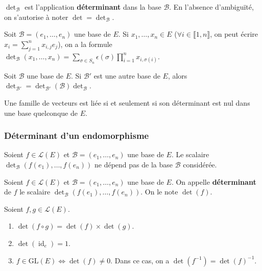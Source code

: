   \begin{definition}
    $\det_{\mathcal{B}}$ est l'application \textbf{déterminant} dans la base $\mathcal{B}$. En l'absence d'ambiguïté, on s'autorise à noter $\det = \det_{\mathcal{B}}$.
  \end{definition}

  \begin{proposition}
    Soit $\mathcal{B} = (e_1, \dots, e_n)$ une base de $E$. Si $x_1, \dots, x_n \in E$ ($\forall i \in \llbracket 1, n \rrbracket$, on peut écrire $x_i = \sum_{j=1}^n x_{i,j} e_j$), on a la formule $\det_{\mathcal{B}}(x_1, \dots, x_n) = \sum_{\sigma \in S_n} \epsilon(\sigma) \prod_{i=1}^n x_{i,\sigma(i)}$.
  \end{proposition}

  \begin{proposition}
    Soit $\mathcal{B}$ une base de $E$. Si $\mathcal{B}'$ est une autre base de $E$, alors $\det_{\mathcal{B}'} = \det_{\mathcal{B}'}(\mathcal{B}) \det_{\mathcal{B}}$.
  \end{proposition}

  \begin{theorem}
    Une famille de vecteurs est liée si et seulement si son déterminant est nul dans une base quelconque de $E$.
  \end{theorem}

  \subsubsection{Déterminant d'un endomorphisme}

  \begin{lemma}
    Soient $f \in \mathcal{L}(E)$ et $\mathcal{B} = (e_1, \dots, e_n)$ une base de $E$. Le scalaire $\det_{\mathcal{B}}(f(e_1), \dots, f(e_n))$ ne dépend pas de la base $\mathcal{B}$ considérée.
  \end{lemma}

  \begin{definition}
    Soient $f \in \mathcal{L}(E)$ et $\mathcal{B} = (e_1, \dots, e_n)$ une base de $E$. On appelle \textbf{déterminant} de $f$ le scalaire $\det_{\mathcal{B}}(f(e_1), \dots, f(e_n))$. On le note $\det(f)$.
  \end{definition}

  \begin{proposition}
    Soient $f, g \in \mathcal{L}(E)$.
    \begin{enumerate}[label={\bfseries(\roman*)}]
      \item $\det (f \circ g) = \det(f) \times \det(g)$.
      \item $\det (\operatorname{id}_e) = 1$.
      \item $f \in \mathrm{GL}(E) \iff \det(f) \neq 0$. Dans ce cas, on a $\det(f^{-1}) = \det(f)^{-1}$.
    \end{enumerate}
  \end{proposition}

